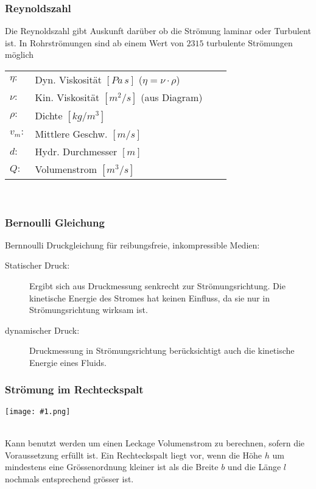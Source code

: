 \documentclass[landscape,a4paper,10pt]{article}
\newcommand{\graphiccol}[1]{
\noindent
\begin{minipage}{\columnwidth}
\centering
\texttt{[image: \#1.png]}
\end{minipage}
\medskip \\
}
\begin{document}
\begin{multicols*}{3}
\subsubsection{Reynoldszahl}
Die Reynoldszahl gibt Auskunft darüber ob die Strömung laminar oder Turbulent ist. In Rohrströmungen sind ab einem Wert von $2315$ turbulente Strömungen möglich
\begin{tabular}{llll}
$\eta:$ & Dyn. Viskosität $[Pa \, s]$ \qquad ($\eta = \nu \cdot \rho$)\\
$\nu:$ & Kin. Viskosität $[m^2/s]$ \qquad (aus Diagram) \\
$\rho:$ & Dichte $[kg/m^3]$  \\
$v_m:$ & Mittlere Geschw. $[m/s]$ \\
$d:$ & Hydr. Durchmesser $[m]$ \\
$Q:$ & Volumenstrom $[m^3/s]$
\end{tabular} \\


\subsubsection{Bernoulli Gleichung}
Bernnoulli Druckgleichung für reibungsfreie, inkompressible Medien:

\begin{description}
\item[Statischer Druck:] Ergibt sich aus Druckmessung senkrecht zur Strömungsrichtung. Die kinetische Energie des Stromes hat keinen Einfluss, da sie nur in Strömungsrichtung wirksam ist.
\item[dynamischer Druck:] Druckmessung in Strömungsrichtung berücksichtigt auch die kinetische Energie eines Fluids. 
\end{description}





\subsubsection{Strömung im Rechteckspalt}
\graphiccol{rechteckspalt}
Kann benutzt werden um einen Leckage Volumenstrom zu berechnen, sofern die Voraussetzung erfüllt ist. Ein Rechteckspalt liegt vor, wenn die Höhe $h$ um mindestens eine Grössenordnung kleiner ist als die Breite $b$ und die Länge $l$ nochmals entsprechend grösser ist. \\



\end{multicols*}
\end{document}

